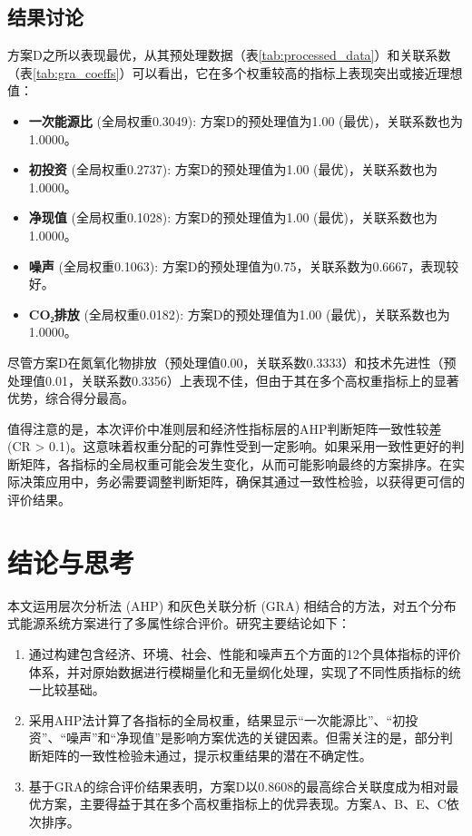 \documentclass[12pt]{ctexart}
\begin{document}
\subsection{结果讨论}
方案D之所以表现最优，从其预处理数据（表\ref{tab:processed_data}）和关联系数（表\ref{tab:gra_coeffs}）可以看出，它在多个权重较高的指标上表现突出或接近理想值：
\begin{itemize}
    \item \textbf{一次能源比} (全局权重0.3049): 方案D的预处理值为1.00 (最优)，关联系数也为1.0000。
    \item \textbf{初投资} (全局权重0.2737): 方案D的预处理值为1.00 (最优)，关联系数也为1.0000。
    \item \textbf{净现值} (全局权重0.1028): 方案D的预处理值为1.00 (最优)，关联系数也为1.0000。
    \item \textbf{噪声} (全局权重0.1063): 方案D的预处理值为0.75，关联系数为0.6667，表现较好。
    \item \textbf{CO₂排放} (全局权重0.0182): 方案D的预处理值为1.00 (最优)，关联系数也为1.0000。
\end{itemize}
尽管方案D在氮氧化物排放（预处理值0.00，关联系数0.3333）和技术先进性（预处理值0.01，关联系数0.3356）上表现不佳，但由于其在多个高权重指标上的显著优势，综合得分最高。

值得注意的是，本次评价中准则层和经济性指标层的AHP判断矩阵一致性较差 (CR > 0.1)。这意味着权重分配的可靠性受到一定影响。如果采用一致性更好的判断矩阵，各指标的全局权重可能会发生变化，从而可能影响最终的方案排序。在实际决策应用中，务必需要调整判断矩阵，确保其通过一致性检验，以获得更可信的评价结果。

\section{结论与思考}
本文运用层次分析法 (AHP) 和灰色关联分析 (GRA) 相结合的方法，对五个分布式能源系统方案进行了多属性综合评价。研究主要结论如下：
\begin{enumerate}
    \item 通过构建包含经济、环境、社会、性能和噪声五个方面的12个具体指标的评价体系，并对原始数据进行模糊量化和无量纲化处理，实现了不同性质指标的统一比较基础。
    \item 采用AHP法计算了各指标的全局权重，结果显示“一次能源比”、“初投资”、“噪声”和“净现值”是影响方案优选的关键因素。但需关注的是，部分判断矩阵的一致性检验未通过，提示权重结果的潜在不确定性。
    \item 基于GRA的综合评价结果表明，方案D以0.8608的最高综合关联度成为相对最优方案，主要得益于其在多个高权重指标上的优异表现。方案A、B、E、C依次排序。
\end{enumerate}
\end{document}
